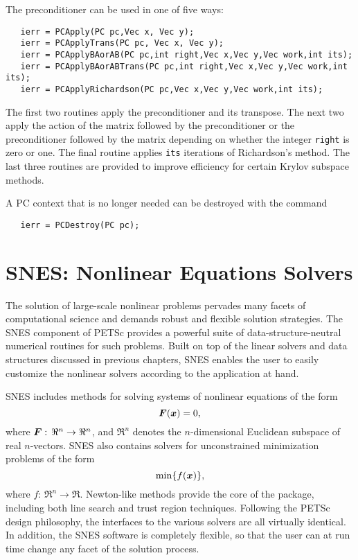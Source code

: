 The preconditioner can be used in one of
five   
ways:  
\begin{verbatim}
   ierr = PCApply(PC pc,Vec x, Vec y);
   ierr = PCApplyTrans(PC pc, Vec x, Vec y);
   ierr = PCApplyBAorAB(PC pc,int right,Vec x,Vec y,Vec work,int its);
   ierr = PCApplyBAorABTrans(PC pc,int right,Vec x,Vec y,Vec work,int its);
   ierr = PCApplyRichardson(PC pc,Vec x,Vec y,Vec work,int its);
\end{verbatim}
The first two routines apply the preconditioner and its transpose. The 
next two apply the action of the matrix followed by the preconditioner 
or the preconditioner followed by the matrix depending on whether 
the 
integer {\tt right} is zero or one. The final routine applies 
{\tt its} iterations of Richardson's method. The last three routines 
are provided to improve efficiency for certain Krylov subspace methods.

A PC context that is no longer needed can be destroyed with the 
command 
\begin{verbatim}
   ierr = PCDestroy(PC pc);
\end{verbatim}

\chapter{SNES: Nonlinear Equations Solvers}

The solution of large-scale nonlinear problems pervades many facets of
computational science and demands robust and flexible solution
strategies. The SNES component of PETSc provides a powerful suite of
data-structure-neutral numerical routines for such problems.  Built on
top of the linear solvers and data structures discussed in previous
chapters, SNES enables the user to easily customize the nonlinear
solvers according to the application at hand.

SNES includes methods for solving systems of nonlinear equations of the form 
\begin{equation}
\mbox{\boldmath \(F\)}(\mbox{\boldmath \(x\)}) = 0,
\label{eq:F=0}
\end{equation}
where $\mbox{\boldmath \(F\)}: \, \Re^n \rightarrow \Re^n$, and $\Re^n$ denotes 
the $n$-dimensional Euclidean subspace of real $n$-vectors.  
SNES also contains solvers for unconstrained minimization problems of 
the form
\begin{equation}
{\rm min} \{ f(\mbox{\boldmath \(x\)}) \},
\label{eq:minF}
\end{equation}
where $f: \, \Re^n \rightarrow \Re$.
Newton-like methods provide the core of the package, including
 both line search  
and trust region  techniques. Following the
PETSc design philosophy, the interfaces to the various solvers are all
virtually identical. In addition, the SNES software is completely
flexible, so that the user can at run time change any facet of the
solution process.


